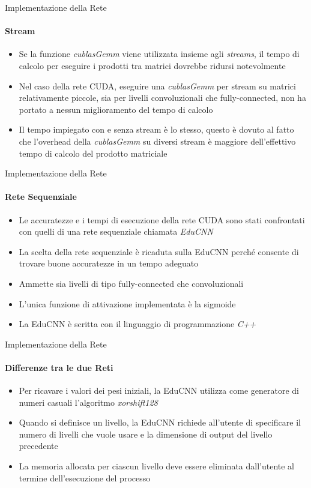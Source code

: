 \documentclass[
 ]{beamer}
\begin{document}
\begin{frame}{Implementazione della Rete}
    \framesubtitle{Stream}
      \begin{itemize} [<+->] 
        \setlength\itemsep{3em}           
            \item \large Se la funzione \emph{cublasGemm} viene utilizzata insieme agli \emph{streams}, il tempo di calcolo per eseguire i prodotti tra matrici dovrebbe ridursi notevolmente
            \item \large Nel caso della rete CUDA, eseguire una \emph{cublasGemm} per stream su matrici relativamente piccole, sia per livelli convoluzionali che fully-connected, non ha portato a nessun miglioramento del tempo di calcolo
            \item \large Il tempo impiegato con e senza stream è lo stesso, questo è dovuto al fatto che l'overhead della \emph{cublasGemm} su diversi stream è maggiore dell'effettivo tempo di calcolo del prodotto matriciale
        \end{itemize}
\end{frame}


\begin{frame}{Implementazione della Rete}
    \framesubtitle{Rete Sequenziale}
    \begin{itemize} [<+->]
        \setlength\itemsep{2em}
        \item \large Le accuratezze e i tempi di esecuzione della rete CUDA sono stati confrontati con quelli di una rete sequenziale chiamata \emph{EduCNN}
        \item \large La scelta della rete sequenziale è ricaduta sulla EduCNN perché consente di trovare buone accuratezze in un tempo adeguato
        \item \large Ammette sia livelli di tipo fully-connected che convoluzionali
        \item \large L'unica funzione di attivazione implementata è la sigmoide
        \item \large La EduCNN è scritta con il linguaggio di programmazione \emph{C++}
    \end{itemize}
\end{frame}


\begin{frame}{Implementazione della Rete}
    \framesubtitle{Differenze tra le due Reti}
    \smallskip
    \begin{itemize} [<+->]
        \setlength\itemsep{2em}
        \item \large Per ricavare i valori dei pesi iniziali, la EduCNN utilizza come generatore di numeri casuali l'algoritmo \emph{xorshift128}
        \item \large Quando si definisce un livello, la EduCNN richiede all'utente di specificare il numero di livelli che vuole usare e la dimensione di output del livello precedente
        \item \large La memoria allocata per ciascun livello deve essere eliminata dall'utente al termine dell'esecuzione del processo 
    \end{itemize}     
\end{frame}
\end{document}

